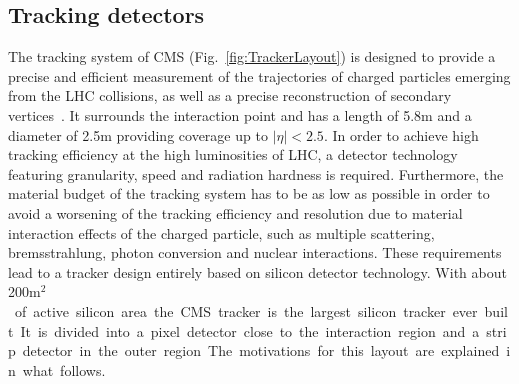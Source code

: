 \subsection{Tracking detectors}

The tracking system of CMS (Fig.~\ref{fig:TrackerLayout}) is designed to provide a precise and efficient measurement of the trajectories of charged particles emerging from the LHC collisions, as well as a precise reconstruction of secondary vertices~\cite{Karimaki:368412}. It surrounds the interaction point and has a length of 5.8\unit{m} and a diameter of 2.5\unit{m} providing coverage up to $|\eta| < 2.5$. In order to achieve high tracking efficiency at the high luminosities of LHC, a detector technology featuring granularity, speed and radiation hardness is required. Furthermore, the material budget of the tracking system has to be as low as possible in order to avoid a worsening of the tracking efficiency and resolution due to material interaction effects of the charged particle, such as multiple scattering, bremsstrahlung, photon conversion and nuclear interactions. These requirements lead to a tracker design entirely based on silicon detector technology. With about 200\unit{m$^2$} of active silicon area the CMS tracker is the largest silicon tracker ever built. It is divided into a pixel detector close to the interaction region and a strip detector in the outer region. The motivations for this layout are explained in what follows.

